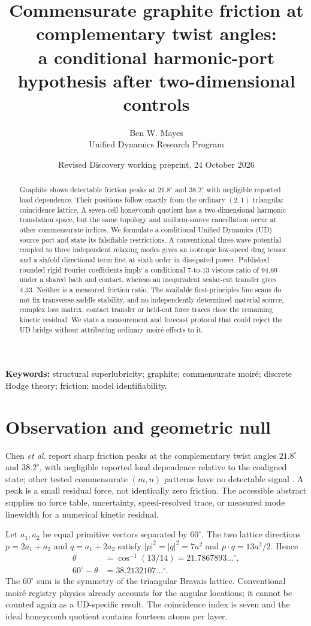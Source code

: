 \documentclass[9pt,a4paper,twocolumn]{extarticle}
\title{Commensurate graphite friction at complementary twist angles:\\a conditional harmonic-port hypothesis after two-dimensional controls}
\author{Ben W. Mayes\\\small Unified Dynamics Research Program}
\date{Revised Discovery working preprint, 24 October 2026}
\begin{document}
\maketitle
\begin{abstract}
Graphite shows detectable friction peaks at $21.8^\circ$ and $38.2^\circ$ with negligible reported load dependence. Their positions follow exactly from the ordinary $(2,1)$ triangular coincidence lattice. A seven-cell honeycomb quotient has a two-dimensional harmonic translation space, but the same topology and uniform-source cancellation occur at other commensurate indices. We formulate a conditional Unified Dynamics (UD) source port and state its falsifiable restrictions. A conventional three-wave potential coupled to three independent relaxing modes gives an isotropic low-speed drag tensor and a sixfold directional term first at sixth order in dissipated power. Published rounded rigid Fourier coefficients imply a conditional 7-to-13 viscous ratio of 94.69 under a shared bath and contact, whereas an inequivalent scalar-cut transfer gives 4.33. Neither is a measured friction ratio. The available first-principles line scans do not fix transverse saddle stability, and no independently determined material source, complex loss matrix, contact transfer or held-out force traces close the remaining kinetic residual. We state a measurement and forecast protocol that could reject the UD bridge without attributing ordinary moir\'e effects to it.
\end{abstract}
\noindent\textbf{Keywords:} structural superlubricity; graphite; commensurate moir\'e; discrete Hodge theory; friction; model identifiability.

\section{Observation and geometric null}
Chen \emph{et al.} report sharp friction peaks at the complementary twist angles $21.8^\circ$ and $38.2^\circ$, with negligible reported load dependence relative to the coaligned state; other tested commensurate $(m,n)$ patterns have no detectable signal \cite{chen}. A peak is a small residual force, not identically zero friction. The accessible abstract supplies no force table, uncertainty, speed-resolved trace, or measured mode linewidth for a numerical kinetic residual.

Let $a_1,a_2$ be equal primitive vectors separated by $60^\circ$. The two lattice directions $p=2a_1+a_2$ and $q=a_1+2a_2$ satisfy $|p|^2=|q|^2=7a^2$ and $p\cdot q=13a^2/2$. Hence
\begin{equation}
 \begin{aligned}
 \theta &= \cos^{-1}(13/14)=21.7867893\ldots^\circ,\\
 60^\circ-\theta &=38.2132107\ldots^\circ.
 \end{aligned} \label{eq:angle}
\end{equation}
The $60^\circ$ sum is the symmetry of the triangular Bravais lattice. Conventional moir\'e registry physics already accounts for the angular locations; it cannot be counted again as a UD-specific result. The coincidence index is seven and the ideal honeycomb quotient contains fourteen atoms per layer.
\end{document}
